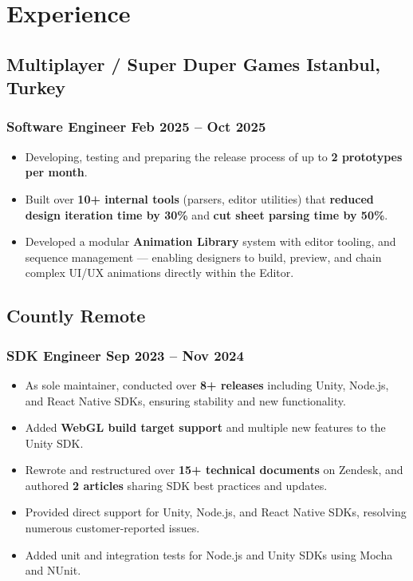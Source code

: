 \documentclass[11pt]{article}
\newcommand{\rside}[1]{
  \hfill {\normalfont\color{accent} #1}%
}
\begin{document}
\section{Experience}

\subsection{Multiplayer / Super Duper Games \rside{Istanbul, Turkey}}
\subsubsection{Software Engineer \rside{Feb 2025 -- Oct 2025}}
\begin{itemize}
  \item Developing, testing and preparing the release process of up to \textbf{2 prototypes per month}.
  \item Built over \textbf{10+ internal tools} (parsers, editor utilities) that \textbf{reduced design iteration time by 30\%} and \textbf{cut sheet parsing time by 50\%}.
  \item Developed a modular \textbf{Animation Library} system with editor tooling, and sequence management — enabling designers to build, preview, and chain complex UI/UX animations directly within the Editor.
\end{itemize}

\subsection{Countly \rside{Remote}}
\subsubsection{SDK Engineer \rside{Sep 2023 -- Nov 2024}}
\begin{itemize}
  \item As sole maintainer, conducted over \textbf{8+ releases} including Unity, Node.js, and React Native SDKs, ensuring stability and new functionality.
  \item Added \textbf{WebGL build target support} and multiple new features to the Unity SDK.
  \item Rewrote and restructured over \textbf{15+ technical documents} on Zendesk, and authored \textbf{2 articles} sharing SDK best practices and updates.
  \item Provided direct support for Unity, Node.js, and React Native SDKs, resolving numerous customer-reported issues.
  \item Added unit and integration tests for Node.js and Unity SDKs using Mocha and NUnit.
\end{itemize}
\end{document}
